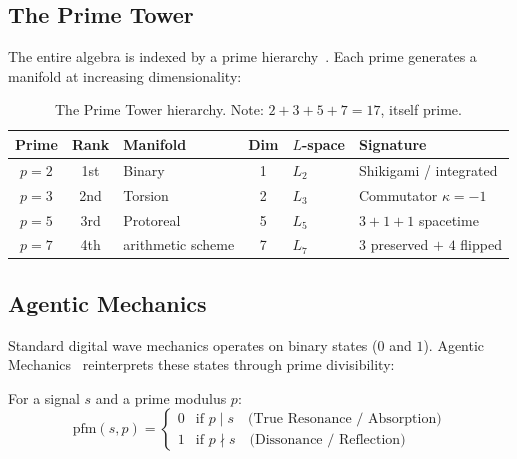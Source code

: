 \subsection{The Prime Tower}

The entire algebra is indexed by a prime hierarchy~\cite{arithmetic schemeManifold}. Each prime generates a manifold at increasing dimensionality:

\begin{table}[H]
\centering
\begin{tabular}{@{}cclcll@{}}
\toprule
\textbf{Prime} & \textbf{Rank} & \textbf{Manifold} & \textbf{Dim} & \textbf{$L$-space} & \textbf{Signature} \\
\midrule
$p=2$ & 1st & Binary & 1 & $L_2$ & Shikigami / integrated \\
$p=3$ & 2nd & Torsion & 2 & $L_3$ & Commutator $\kappa = -1$ \\
$p=5$ & 3rd & Protoreal & 5 & $L_5$ & $3 + 1 + 1$ spacetime \\
$p=7$ & 4th & arithmetic scheme & 7 & $L_7$ & $3$ preserved $+$ $4$ flipped \\
\bottomrule
\end{tabular}
\caption{The Prime Tower hierarchy. Note: $2 + 3 + 5 + 7 = 17$, itself prime.}
\end{table}

\subsection{Agentic Mechanics}

Standard digital wave mechanics operates on binary states ($0$ and $1$). Agentic Mechanics~\cite{PrimeFieldMechanics} reinterprets these states through prime divisibility:

\begin{definition}
For a signal $s$ and a prime modulus $p$:
\begin{equation}
    \text{pfm}(s, p) = \begin{cases} 0 & \text{if } p \mid s \quad \text{(True Resonance / Absorption)} \\ 1 & \text{if } p \nmid s \quad \text{(Dissonance / Reflection)} \end{cases}
\end{equation}
\end{definition}

